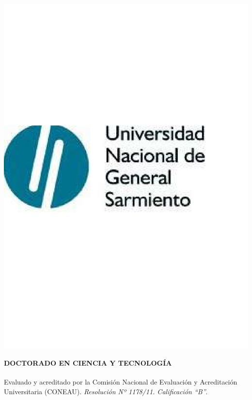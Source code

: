 \newpage
\vspace{-3cm}
\begin{flushright}
	\includegraphics[width=0.33\linewidth]{../../Logos/LogoUNGS.pdf}
\end{flushright}

	\begin{center}
		\textbf{DOCTORADO EN CIENCIA Y TECNOLOGÍA}\vspace{-3mm}\\
		\hrulefill\\
		{\small Evaluado y acreditado por la Comisión Nacional de Evaluación y Acreditación Universitaria (CONEAU). \emph{Resolución Nº 1178/11. Calificación “B”}.}
	\end{center}
	
